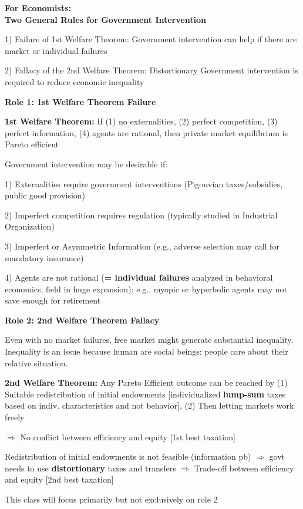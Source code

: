 \documentclass[landscape]{slides}
\begin{document}
\begin{slide}
\begin{center}
{\bf For Economists: \\ Two General Rules for Government Intervention}
\end{center}

1) Failure of 1st Welfare Theorem: Government intervention can help
if there are market or individual failures

2) Fallacy of the 2nd Welfare Theorem: Distortionary Government
intervention is required to reduce economic inequality
\end{slide}

\begin{slide}
\begin{center}
{\bf Role 1: 1st Welfare Theorem Failure}
\end{center}

{\bf 1st Welfare Theorem:} If (1) no externalities, (2) perfect
competition, (3) perfect information, (4) agents are rational,
then private market equilibrium is Pareto efficient

Government intervention may be desirable if:

1) Externalities require government interventions (Pigouvian
taxes/subsidies, public good provision)

2) Imperfect competition requires regulation (typically studied in
Industrial Organization)

3) Imperfect or Asymmetric Information (e.g., adverse
selection may call for mandatory insurance)

4) Agents are not rational ({\bf = individual failures}
analyzed in behavioral economics, field in huge expansion): e.g.,
myopic or hyperbolic agents may not save enough for retirement

\end{slide}

\begin{slide}
\begin{center}
{\bf Role 2: 2nd Welfare Theorem Fallacy}
\end{center}

Even with no market failures, free market might generate
substantial inequality. 
Inequality is an issue because human are social beings: people care
about their relative situation.

{\bf 2nd Welfare Theorem:} Any Pareto Efficient outcome can be
reached by (1) Suitable redistribution of initial endowments
[individualized {\bf lump-sum} taxes based on indiv.
characteristics and not behavior], (2) Then letting markets work
freely

$\Rightarrow$ No conflict between efficiency and equity [1st best taxation]

Redistribution of initial endowments is not feasible
(information pb) $\Rightarrow$ govt needs to use {\bf distortionary} taxes
and transfers  $\Rightarrow$ Trade-off between
efficiency and equity [2nd best taxation]

This class will focus primarily but not exclusively on role 2

\end{slide}
\end{document}
